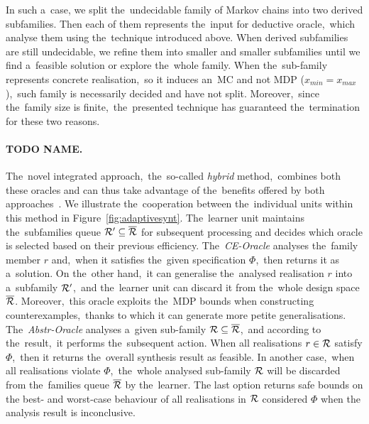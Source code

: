 In such a~case, we split the~undecidable family of Markov chains into two derived subfamilies. 
Then each of them represents the~input for deductive oracle,~which analyse them using the~technique introduced above.
When derived subfamilies are still undecidable, we refine them into smaller and smaller subfamilies until we find a~feasible solution or explore the~whole family.
When the~sub-family represents concrete realisation,~so it induces an~MC and not MDP ($x_{min} = x_{max}$),~such family is necessarily decided and have not split.
Moreover,~since the~family size is finite,~the~presented technique has guaranteed the~termination for these two reasons.
 
\paragraph{TODO NAME.} The~novel integrated approach,~the~so-called \textit{hybrid} method,~combines both these oracles and can thus take advantage of the~benefits offered by both approaches~\cite{roman-DP,tacas21}.
We illustrate the~cooperation between the~individual units within this method in Figure~\ref{fig:adaptivesynt}.
The~learner unit maintains the~subfamilies queue $\mathcal{R}' \subseteq \overline{\mathcal{R}}$ for subsequent processing and decides which oracle is selected based on their previous efficiency.
The~\textit{CE-Oracle} analyses the~family member $r$ and,~when it satisfies the~given specification $\varPhi$,~then returns it as a~solution.
On the~other hand,~it can generalise the~analysed realisation $r$ into a~subfamily $\mathcal{R}'$,~and the~learner unit can discard it from the~whole design space $\overline{\mathcal{R}}$.
Moreover,~this oracle exploits the~MDP bounds when constructing counterexamples,~thanks to which it can generate more petite generalisations.
The~\textit{Abstr-Oracle} analyses a~given sub-family $\mathcal{R} \subseteq \overline{\mathcal{R}}$,~and according to the~result,~it performs the~subsequent action.
When all realisations $r \in \mathcal{R}$ satisfy $\varPhi$,~then it returns the~overall synthesis result as feasible.
In another case,~when all realisations violate $\varPhi$,~the~whole analysed sub-family $\mathcal{R}$ will be discarded from the~families queue $\overline{\mathcal{R}}$ by the~learner.
The last option returns safe bounds on the best- and worst-case behaviour of all realisations in $\mathcal{R}$ considered $\varPhi$ when the analysis result is inconclusive.

